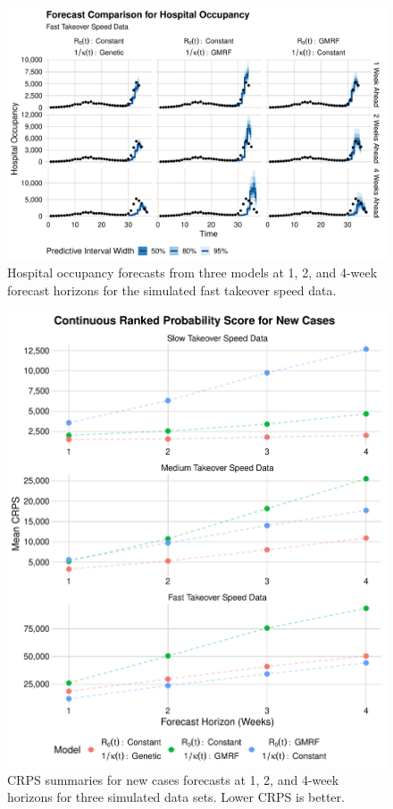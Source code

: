 \begin{figure}
    \centering
    \includegraphics[width=1.0\columnwidth]{simulated_forecast_comparison_data_hospitalizations_fast_plot}
\caption[Hospital occupancy forecasts for simulated fast takeover speed data.]{Hospital occupancy forecasts from three models at 1, 2, and 4-week forecast horizons for the simulated fast takeover speed data.}
    \label{ch_5:fig:simulated_forecast_comparison_data_hospitalizations_fast_plot}
\end{figure}

\begin{figure}
    \centering
    \includegraphics[width=1.0\columnwidth]{simulated_crps_comparison_dotplot_data_new_cases_plot}
    \caption{CRPS summaries for new cases forecasts at 1, 2, and 4-week horizons for three simulated data sets. Lower CRPS is better.}
    \label{ch_5:fig:simulated_crps_comparison_dotplot_data_new_cases_plot}
\end{figure}

